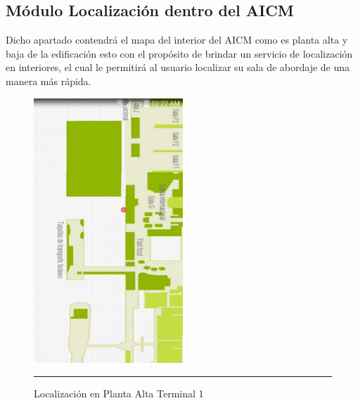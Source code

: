 \subsection{Módulo Localización dentro del AICM}
Dicho apartado contendrá el mapa del interior del AICM como es planta alta y baja de la edificación esto con el propósito de brindar un servicio de localización en interiores, 
el cual le permitirá al usuario localizar su sala de abordaje de una manera más rápida.

\begin{figure}[h]
	\centering
		\includegraphics[width=0.5\textwidth]{Figuras/ubikpa.jpg}
		\rule{30em}{0.5pt}
	\caption[Localización en Planta Alta Terminal 1]{Localización en Planta Alta Terminal 1}
	\label{fig:indoorPA}
\end{figure}

